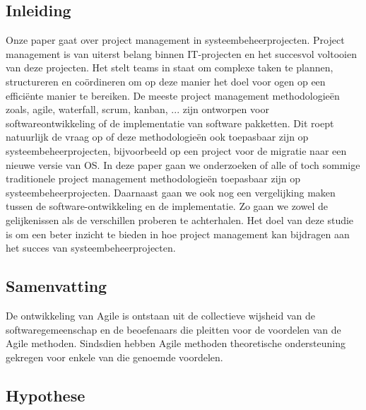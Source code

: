 \documentclass{article}
\begin{document}
    \subsection{Inleiding}
    Onze paper gaat over project management in systeembeheerprojecten. 
    Project management is van uiterst belang binnen IT-projecten en het succesvol voltooien van deze projecten. 
    Het stelt teams in staat om complexe taken te plannen, structureren en coördineren om op deze manier het doel voor ogen op een efficiënte manier te bereiken. \newline
    De meeste project management methodologieën zoals, agile, waterfall, scrum, kanban, ... zijn ontworpen voor softwareontwikkeling of de implementatie van software pakketten.
    Dit roept natuurlijk de vraag op of deze methodologieën ook toepasbaar zijn op systeembeheerprojecten, bijvoorbeeld op een project voor de migratie naar een nieuwe versie van OS. \newline
    In deze paper gaan we onderzoeken of alle of toch sommige traditionele project management methodologieën toepasbaar zijn op systeembeheerprojecten.
    Daarnaast gaan we ook nog een vergelijking maken tussen de software-ontwikkeling en de implementatie.
    Zo gaan we zowel de gelijkenissen als de verschillen proberen te achterhalen. \newline
    Het doel van deze studie is om een beter inzicht te bieden in hoe project management kan bijdragen aan het succes van systeembeheerprojecten. 

    \subsection{Samenvatting}
    De ontwikkeling van Agile is ontstaan ​​uit de collectieve wijsheid van de softwaregemeenschap en de beoefenaars die pleitten voor de voordelen van de Agile methoden. 
    Sindsdien hebben Agile methoden theoretische ondersteuning gekregen voor enkele van die genoemde voordelen. \autocite{STRAY2022107058}
    \subsection{Hypothese}
\end{document}
